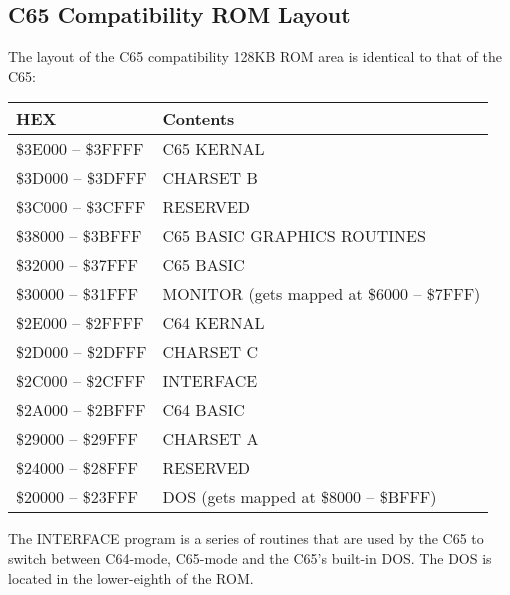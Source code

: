 

\subsection{C65 Compatibility ROM Layout}

The layout of the C65 compatibility 128KB ROM area is identical to that of the C65:

\begin{center}
  {\ttfamily
  \setlength{\tabcolsep}{3pt}
  \begin{tabular}{|l|l|}
  \hline
  {\bf{HEX}} & {\bf{Contents}} \\
  \hline
  \$3E000 -- \$3FFFF & C65 KERNAL \\
  \hline
  \$3D000 -- \$3DFFF & CHARSET B \\
  \hline
  \$3C000 -- \$3CFFF & RESERVED \\
  \hline
  \$38000 -- \$3BFFF & C65 BASIC GRAPHICS ROUTINES \\
  \hline
  \$32000 -- \$37FFF & C65 BASIC \\
  \hline
  \$30000 -- \$31FFF & MONITOR (gets mapped at \$6000 -- \$7FFF) \\
  \hline
  \$2E000 -- \$2FFFF & C64 KERNAL \\
  \hline
  \$2D000 -- \$2DFFF & CHARSET C \\
  \hline
  \$2C000 -- \$2CFFF & INTERFACE \\
  \hline
  \$2A000 -- \$2BFFF & C64 BASIC \\
  \hline
  \$29000 -- \$29FFF & CHARSET A \\
  \hline
  \$24000 -- \$28FFF & RESERVED \\
  \hline
  \$20000 -- \$23FFF & DOS (gets mapped at \$8000 -- \$BFFF) \\
  \hline
  \end{tabular}
  }
\end{center}

The INTERFACE program is a series of routines that are used by the C65
to switch between C64-mode, C65-mode and the C65's built-in DOS.  The
DOS is located in the lower-eighth of the ROM.





